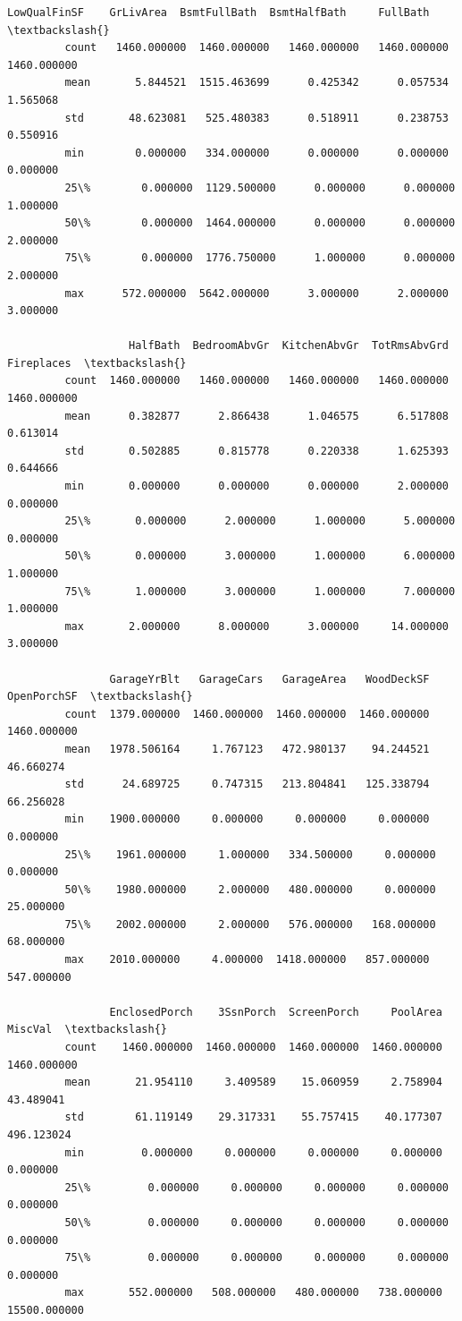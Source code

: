\documentclass[11pt, a4paper , landscape]{article}
\begin{document}
\begin{Verbatim}[commandchars=\\\{\}]
                LowQualFinSF    GrLivArea  BsmtFullBath  BsmtHalfBath     FullBath  \textbackslash{}
         count   1460.000000  1460.000000   1460.000000   1460.000000  1460.000000   
         mean       5.844521  1515.463699      0.425342      0.057534     1.565068   
         std       48.623081   525.480383      0.518911      0.238753     0.550916   
         min        0.000000   334.000000      0.000000      0.000000     0.000000   
         25\%        0.000000  1129.500000      0.000000      0.000000     1.000000   
         50\%        0.000000  1464.000000      0.000000      0.000000     2.000000   
         75\%        0.000000  1776.750000      1.000000      0.000000     2.000000   
         max      572.000000  5642.000000      3.000000      2.000000     3.000000   
         
                   HalfBath  BedroomAbvGr  KitchenAbvGr  TotRmsAbvGrd   Fireplaces  \textbackslash{}
         count  1460.000000   1460.000000   1460.000000   1460.000000  1460.000000   
         mean      0.382877      2.866438      1.046575      6.517808     0.613014   
         std       0.502885      0.815778      0.220338      1.625393     0.644666   
         min       0.000000      0.000000      0.000000      2.000000     0.000000   
         25\%       0.000000      2.000000      1.000000      5.000000     0.000000   
         50\%       0.000000      3.000000      1.000000      6.000000     1.000000   
         75\%       1.000000      3.000000      1.000000      7.000000     1.000000   
         max       2.000000      8.000000      3.000000     14.000000     3.000000   
         
                GarageYrBlt   GarageCars   GarageArea   WoodDeckSF  OpenPorchSF  \textbackslash{}
         count  1379.000000  1460.000000  1460.000000  1460.000000  1460.000000   
         mean   1978.506164     1.767123   472.980137    94.244521    46.660274   
         std      24.689725     0.747315   213.804841   125.338794    66.256028   
         min    1900.000000     0.000000     0.000000     0.000000     0.000000   
         25\%    1961.000000     1.000000   334.500000     0.000000     0.000000   
         50\%    1980.000000     2.000000   480.000000     0.000000    25.000000   
         75\%    2002.000000     2.000000   576.000000   168.000000    68.000000   
         max    2010.000000     4.000000  1418.000000   857.000000   547.000000   
         
                EnclosedPorch    3SsnPorch  ScreenPorch     PoolArea       MiscVal  \textbackslash{}
         count    1460.000000  1460.000000  1460.000000  1460.000000   1460.000000   
         mean       21.954110     3.409589    15.060959     2.758904     43.489041   
         std        61.119149    29.317331    55.757415    40.177307    496.123024   
         min         0.000000     0.000000     0.000000     0.000000      0.000000   
         25\%         0.000000     0.000000     0.000000     0.000000      0.000000   
         50\%         0.000000     0.000000     0.000000     0.000000      0.000000   
         75\%         0.000000     0.000000     0.000000     0.000000      0.000000   
         max       552.000000   508.000000   480.000000   738.000000  15500.000000   
         

\end{Verbatim}
\end{document}
